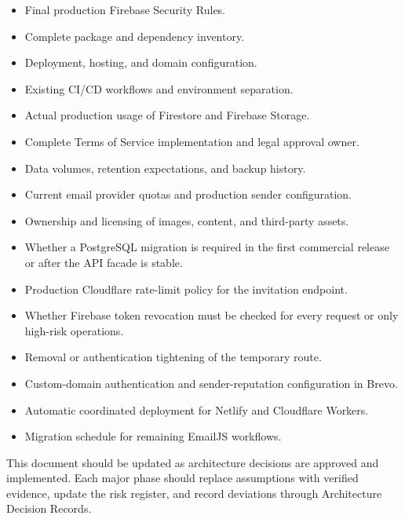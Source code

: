 \documentclass[11pt,a4paper,oneside]{report}
\begin{document}
\begin{itemize}
  \item Final production Firebase Security Rules.
  \item Complete package and dependency inventory.
  \item Deployment, hosting, and domain configuration.
  \item Existing CI/CD workflows and environment separation.
  \item Actual production usage of Firestore and Firebase Storage.
  \item Complete Terms of Service implementation and legal approval owner.
  \item Data volumes, retention expectations, and backup history.
  \item Current email provider quotas and production sender configuration.
  \item Ownership and licensing of images, content, and third-party assets.
  \item Whether a PostgreSQL migration is required in the first commercial release or after the API facade is stable.
  \item Production Cloudflare rate-limit policy for the invitation endpoint.
  \item Whether Firebase token revocation must be checked for every request or only high-risk operations.
  \item Removal or authentication tightening of the temporary  route.
  \item Custom-domain authentication and sender-reputation configuration in Brevo.
  \item Automatic coordinated deployment for Netlify and Cloudflare Workers.
  \item Migration schedule for remaining EmailJS workflows.
\end{itemize}

\begin{notebox}
This document should be updated as architecture decisions are approved and implemented. Each major phase should replace assumptions with verified evidence, update the risk register, and record deviations through Architecture Decision Records.
\end{notebox}
\end{document}

